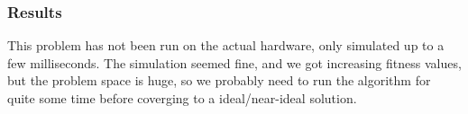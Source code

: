 \subsubsection{Results}

This problem has not been run on the actual hardware, only simulated up to a few milliseconds.
The simulation seemed fine, and we got increasing fitness values, but the problem space is huge, so we probably need to run the algorithm for quite some time before coverging to a ideal/near-ideal solution.

%
%
